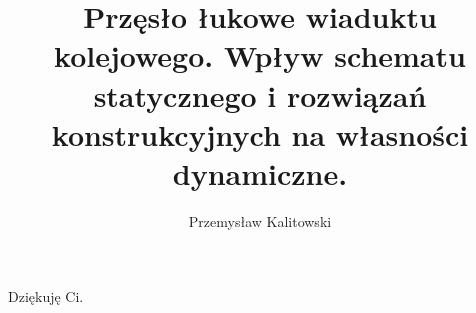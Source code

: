 
\title{Przęsło łukowe wiaduktu kolejowego. Wpływ schematu statycznego i rozwiązań konstrukcyjnych na własności dynamiczne.}
\author{Przemysław Kalitowski}



\begin{sloppypar}
\frontmatter

\myemptypage



\myemptypage





\thispagestyle{empty}
\vspace*{20cm}
\hfill Dziękuję Ci.
\vfill
\pagebreak[4]


\myemptypage


\tableofcontents
\newpage






\mainmatter




	





	




\printbibliography[heading=bibintoc]
\end{sloppypar}
